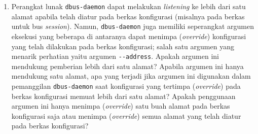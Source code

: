 \begin{enumerate}
    \item Perangkat lunak \verb|dbus-daemon| dapat melakukan \textit{listening} ke lebih dari satu alamat apabila telah diatur pada berkas konfigurasi (misalnya pada berkas  untuk bus \textit{session}). Namun, \verb|dbus-daemon| juga memiliki seperangkat argumen eksekusi \cite{dbus-daemon-man-page} yang beberapa di antaranya dapat menimpa (\textit{override}) konfigurasi yang telah dilakukan pada berkas konfigurasi; salah satu argumen yang menarik perhatian yaitu argumen \verb|--address|. Apakah argumen ini mendukung pemberian lebih dari satu alamat? Apabila argumen ini hanya mendukung satu alamat, apa yang terjadi jika argumen ini digunakan dalam pemanggilan \verb|dbus-daemon| saat konfigurasi yang tertimpa (\textit{override}) pada berkas konfigurasi memuat lebih dari satu alamat? Apakah penggunaan argumen ini hanya menimpa (\textit{override}) satu buah alamat pada berkas konfigurasi saja atau menimpa (\textit{override}) semua alamat yang telah diatur pada berkas konfigurasi?
\end{enumerate}
